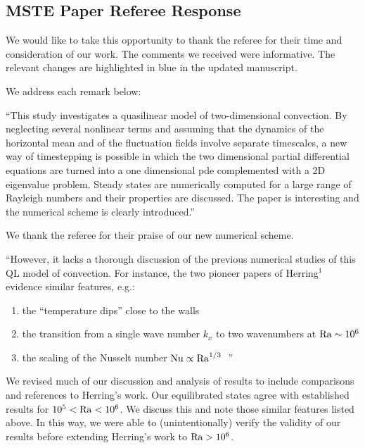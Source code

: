\documentclass{article}
\begin{document}
\subsection*{MSTE Paper Referee Response}


We would like to take this opportunity to thank the referee for their time and consideration of our work.
The comments we received were informative.
The relevant changes are highlighted in blue in the updated manuscript.

We address each remark below:

\vspace{0.4cm}

\noindent ``This study investigates a quasilinear model of two-dimensional convection. By neglecting
several nonlinear terms and assuming that the dynamics of the horizontal mean and of the
fluctuation fields involve separate timescales, a new way of timestepping is possible in which
the two dimensional partial differential equations are turned into a one dimensional pde
complemented with a 2D eigenvalue problem. Steady states are numerically computed for
a large range of Rayleigh numbers and their properties are discussed.
The paper is interesting and the numerical scheme is clearly introduced.''

\vspace{0.4cm}
We thank the referee for their praise of our new numerical scheme.
\vspace{0.4cm}

``However, it
lacks a thorough discussion of the previous numerical studies of this QL model of convection.
For instance, the two pioneer papers of Herring$^1$
evidence similar features, e.g.:
\begin{enumerate}
    \item the “temperature dips” close to the walls
    \item the transition from a single wave number $k_x$ to two wavenumbers at $\rm{Ra} \sim 10^6$
    \item the scaling of the Nusselt number $\rm{Nu} \propto \rm{Ra}^{1/3}\;$ ''
\end{enumerate}

\vspace{0.4cm}

\noindent We revised much of our discussion and analysis of results to include comparisons and references to Herring's work.
Our equilibrated states agree with established results for $10^5 < \rm{Ra} < 10^6$.
We discuss this and note those similar features listed above.
In this way, we were able to (unintentionally) verify the validity of our results before extending Herring's work to $\rm{Ra} > 10^6$.
\end{document}
